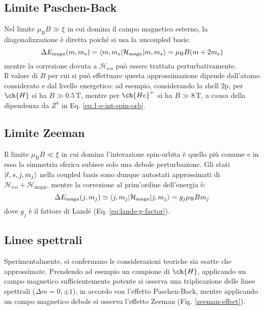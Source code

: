 \subsection{Limite Paschen-Back}

Nel limite $ \mu_\text{B} B \gg \xi $ in cui domina il campo magnetico esterno, la diagonalizzazione è diretta poiché si usa la uncoupled basis:
\begin{equation}
	\Delta E_\text{magn}(m,m_s) = \braket{m,m_s | \mathcal{H}_\text{magn} | m,m_s} = \mu_\text{B} B (m + 2m_s)
\end{equation}
mentre la correzione dovuta a $ \mathcal{H}_\text{s-o} $ può essere trattata perturbativamente. \\
Il valore di $ B $ per cui si può effettuare questa approssimazione dipende dall'atomo considerato e dal livello energetico: ad esempio, considerando la shell $ \text{2p} $, per $ \ch{H} $ si ha $ B \gg 0.5 \,\text{T} $, mentre per $ \ch{He}^+ $ si ha $ B \gg 8 \,\text{T} $, a causa della dipendenza da $ Z^4 $ in Eq. \ref{eq:1-e-int-spin-orb}.

\subsection{Limite Zeeman}

Il limite $ \mu_\text{B} B \ll \xi $ in cui domina l'interazione spin-orbita è quello più comune e in esso la simmetria sferica subisce solo una debole perturbazione. Gli stati $ \ket{\ell,s,j,m_j} $ nella coupled basis sono dunque autostati approssimati di $ \mathcal{H}_\text{s-o} + \mathcal{H}_\text{magn} $, mentre la correzione al prim'ordine dell'energia è:
\begin{equation}
	\Delta E_\text{magn}(j,m_j) \simeq \braket{j,m_j | \mathcal{H}_\text{magn} | j,m_j} = g_j \mu_\text{B} B m_j
\end{equation}
dove $ g_j $ è il fattore di Landé (Eq. \ref{eq:lande-g-factor}).

\subsection{Linee spettrali}

Sperimentalmente, si confermano le considerazioni teoriche sia esatte che approssimate. Prendendo ad esempio un campione di $ \ch{H} $, applicando un campo magnetico sufficientemente potente si osserva una triplicazione delle linee spettrali ($ \Delta m = 0, \pm 1 $), in accordo con l'effetto Paschen-Back, mentre applicando un campo magnetico debole si osserva l'effetto Zeeman (Fig. \ref{zeeman-effect}).

